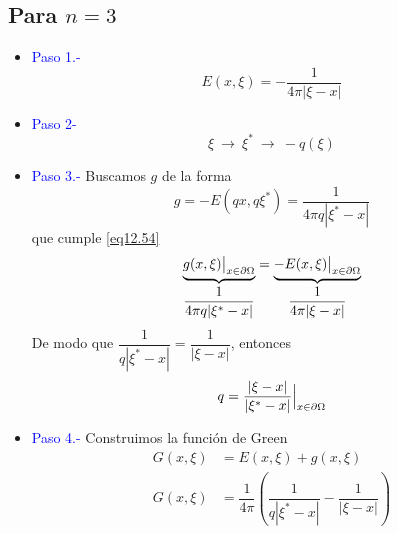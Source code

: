 \documentclass[../main]{subfiles}
\begin{document}
    \subsection*{Para \texorpdfstring{$n=3$}{TEXT}}
    \begin{itemize}
        \item[] \textcolor{blue}{Paso 1.-}
        $$
        E(x,\xi)=-\dfrac{1}{4\pi|\xi-x|}
        $$
        \item[] \textcolor{blue}{Paso 2-}
        $$
        \xi \ \rightarrow \ \xi^* \ \rightarrow \ -q(\xi)
        $$
        \item[] \textcolor{blue}{Paso 3.-} Buscamos $g$ de la forma
        $$
        g=-E(qx,q\xi^*)=\dfrac{1}{4\pi q|\xi^*-x|}
        $$
        que cumple \eqref{eq12.54}
        \begin{equation*}
            \underbrace{g(x,\xi)\big{|}_{x\in\partial\Omega}}_{\dfrac{1}{4\pi q|\xi^*-x|}}=\underbrace{-E(x,\xi)\big{|}_{x\in\partial\Omega}}_{\dfrac{1}{4\pi|\xi-x|}}
        \end{equation*}
        De modo que $\dfrac{1}{q|\xi^*-x|}=\dfrac{1}{|\xi-x|}$, entonces
        $$
        q=\dfrac{|\xi-x|}{|\xi^*-x|}\Big{|}_{x\in\partial\Omega}
        $$
        \item[] \textcolor{blue}{Paso 4.-} Construimos la función de Green
        \begin{align*}
            G(x,\xi)&=E(x,\xi)+g(x,\xi) \\
            G(x,\xi)&=\dfrac{1}{4\pi}\left(\dfrac{1}{q|\xi^*-x|}-\dfrac{1}{|\xi-x|}\right)
        \end{align*}
    \end{itemize}
\end{document}
